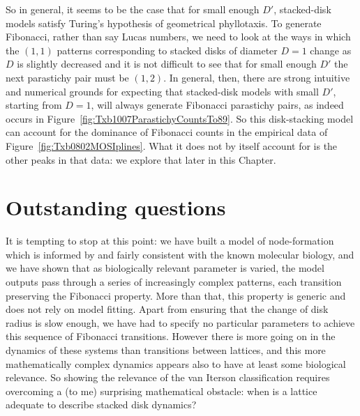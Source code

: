 \clearpage
{}
So in general, it seems to be the case that for small enough $D'$, stacked-disk models satisfy Turing's hypothesis of geometrical phyllotaxis. To generate Fibonacci, rather than say Lucas numbers, we need to look at the ways in which the $(1,1)$ patterns corresponding to stacked disks of diameter $D=1$ change as $D$ is slightly decreased and it is not difficult to see that for small enough $D'$ the next parastichy pair must be $(1,2)$. In general, then, there are strong intuitive and numerical grounds for expecting that stacked-disk models with small $D'$, starting from $D=1$, will always generate Fibonacci parastichy pairs, as indeed occurs in Figure~\ref{fig:Txb1007ParastichyCountsTo89}.
So this disk-stacking model can account for the dominance of Fibonacci counts in the empirical data of Figure~\ref{fig:Txb0802MOSIplines}.  What it does not by itself account for is the other peaks in that data: we explore that later in this Chapter.


\section{Outstanding questions} 


It is tempting to stop at this point: we have built a model of node-formation which is informed by and fairly consistent with the known molecular biology, and we have shown that as biologically relevant parameter is varied, the model outputs pass through a series of increasingly complex patterns, each transition preserving the Fibonacci property. More than that, this property is generic and does not rely on model fitting. Apart from ensuring that the change of disk radius is slow enough, we have had to specify no particular parameters to achieve this sequence of Fibonacci transitions. However there is more going on in the dynamics of these systems than transitions between lattices, and this more mathematically complex dynamics appears also to have at least some biological relevance.  So showing the relevance of the van Iterson classification requires overcoming  a (to me) surprising mathematical obstacle: when is a lattice  adequate to describe stacked disk dynamics?


